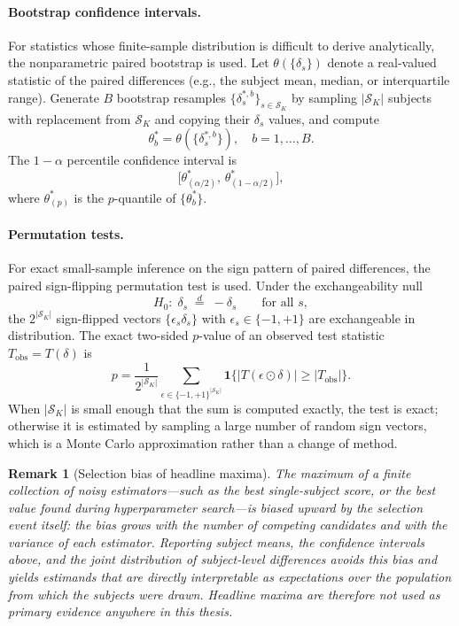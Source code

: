 \documentclass[onluarkali,ingilizce,yukseklisans,karton,LisansustuEgitim]{itutez}
\newtheorem{remark}{Remark}[chapter]
\providecommand{\1}{\mathbf{1}}
\providecommand{\Sset}{\mathcal{S}}
\begin{document}
\paragraph{Bootstrap confidence intervals.}
For statistics whose finite-sample distribution is difficult to derive analytically, the nonparametric paired bootstrap is used. Let $\theta(\{\delta_s\})$ denote a real-valued statistic of the paired differences (e.g., the subject mean, median, or interquartile range). Generate $B$ bootstrap resamples $\{\delta_s^{*,b}\}_{s\in\Sset_K}$ by sampling $|\Sset_K|$ subjects with replacement from $\Sset_K$ and copying their $\delta_s$ values, and compute
\[
  \theta_b^*=\theta(\{\delta_s^{*,b}\}),\quad b=1,\ldots,B.
\]
The $1-\alpha$ percentile confidence interval is
\begin{equation}
  \bigl[\theta^*_{(\alpha/2)},\,\theta^*_{(1-\alpha/2)}\bigr],
  \label{eq:bootstrap}
\end{equation}
where $\theta^*_{(p)}$ is the $p$-quantile of $\{\theta_b^*\}$.

\paragraph{Permutation tests.}
For exact small-sample inference on the sign pattern of paired differences, the paired sign-flipping permutation test is used. Under the exchangeability null
\[
  H_0\colon\;\delta_s\;\overset{d}{=}\;-\delta_s\qquad\text{for all } s,
\]
the $2^{|\Sset_K|}$ sign-flipped vectors $\{\epsilon_s\delta_s\}$ with $\epsilon_s\in\{-1,+1\}$ are exchangeable in distribution. The exact two-sided $p$-value of an observed test statistic $T_{\mathrm{obs}}=T(\delta)$ is
\begin{equation}
  p=\frac{1}{2^{|\Sset_K|}}\sum_{\epsilon\in\{-1,+1\}^{|\Sset_K|}}\1\bigl\{|T(\epsilon\odot\delta)|\geq|T_{\mathrm{obs}}|\bigr\}.
  \label{eq:permutation}
\end{equation}
When $|\Sset_K|$ is small enough that the sum is computed exactly, the test is exact; otherwise it is estimated by sampling a large number of random sign vectors, which is a Monte Carlo approximation rather than a change of method.

\begin{remark}[Selection bias of headline maxima]
\label{rem:headline-bias}
The maximum of a finite collection of noisy estimators---such as the best single-subject score, or the best value found during hyperparameter search---is biased upward by the selection event itself: the bias grows with the number of competing candidates and with the variance of each estimator. Reporting subject means, the confidence intervals above, and the joint distribution of subject-level differences avoids this bias and yields estimands that are directly interpretable as expectations over the population from which the subjects were drawn. Headline maxima are therefore not used as primary evidence anywhere in this thesis.
\end{remark}
\end{document}
